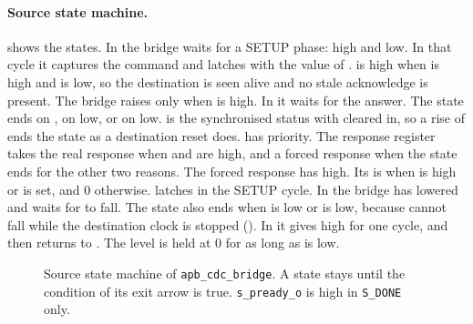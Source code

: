 \paragraph{Source state machine.}  shows the states. In  the bridge waits for a SETUP phase:  high and  low. In that cycle it captures the command and latches  with the value of .  is high when  is high and  is low, so the destination is seen alive and no stale acknowledge is present. The bridge raises  only when  is high. In  it waits for the answer. The state ends on , on  low, or on  low.  is the synchronised status  with  cleared in, so a rise of  ends the state as a destination reset does.  has priority. The response register takes the real response when  and  are high, and a forced response when the state ends for the other two reasons. The forced response has  high. Its  is  when  is high or  is set, and 0 otherwise.  latches  in the SETUP cycle. In  the bridge has lowered  and waits for  to fall. The state also ends when  is low or  is low, because  cannot fall while the destination clock is stopped (). In  it gives  high for one cycle, and then returns to . The level  is held at 0 for as long as  is low.

\begin{figure}[ht]
  \centering
  \caption{Source state machine of \texttt{apb\_cdc\_bridge}. A state stays until the condition of its exit arrow is true. \texttt{s\_pready\_o} is high in \texttt{S\_DONE} only.}\label{fig:tm:mod:apb-cdc-bridge:sfsm}
\end{figure}

